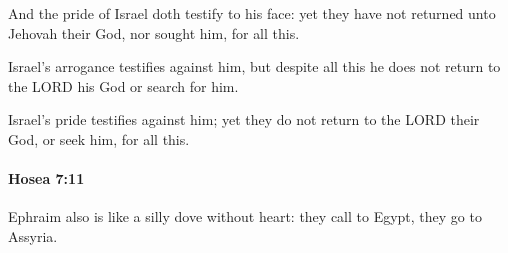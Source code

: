 			\begin{versebox}
					\item[BHS] 
					\item[LXX] 
					\item[ASV] And the pride of Israel doth testify to his face: yet they have not returned unto Jehovah their God, nor sought him, for all this.
					\item[NIV] Israel’s arrogance testifies against him, but despite all this he does not return to the LORD his God or search for him.
					\item[NRSV] Israel’s pride testifies against him; yet they do not return to the LORD their God, or seek him, for all this.
			\end{versebox}

		\paragraph{Hosea 7:11} %
			\label{HOSEA-7-11}

			Ephraim also is like a silly dove without heart: they call to Egypt, they go to Assyria.

